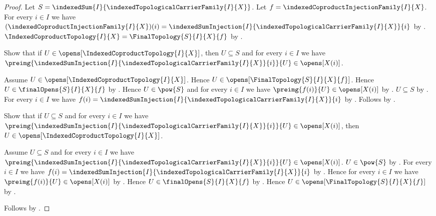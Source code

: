 \begin{proof}
    Let $S=\indexedSum{I}{
        \indexedTopologicalCarrierFamily{I}{X}}$.
    Let $f=\indexedCoproductInjectionFamily{I}{X}$.
    For every $i\in I$ we have
        $(\indexedCoproductInjectionFamily{I}{X})(i)
            =\indexedSumInjection{I}{
                \indexedTopologicalCarrierFamily{I}{X}}{i}$ by
        .
    $\IndexedCoproductTopology{I}{X}=\FinalTopology{S}{I}{X}{f}$ by
        .

    Show that if $U\in\opens[\IndexedCoproductTopology{I}{X}]$, then
        $U\subseteq S$ and for every $i\in I$ we have
            $\preimg{
                \indexedSumInjection{I}{
                    \indexedTopologicalCarrierFamily{I}{X}}{i}}{U}
            \in\opens[X(i)]$.
    \begin{subproof}
        Assume $U\in\opens[\IndexedCoproductTopology{I}{X}]$.
        Hence $U\in\opens[\FinalTopology{S}{I}{X}{f}]$.
        Hence $U\in\finalOpens{S}{I}{X}{f}$ by
            .
        Hence $U\in\pow{S}$ and for every $i\in I$ we have
            $\preimg{f(i)}{U}\in\opens[X(i)]$ by .
        $U\subseteq S$ by .
        For every $i\in I$ we have
            $f(i)=\indexedSumInjection{I}{
                \indexedTopologicalCarrierFamily{I}{X}}{i}$ by
            \auto.
        Follows by \auto.
    \end{subproof}

    Show that if $U\subseteq S$ and for every $i\in I$ we have
        $\preimg{
            \indexedSumInjection{I}{
                \indexedTopologicalCarrierFamily{I}{X}}{i}}{U}
        \in\opens[X(i)]$, then
        $U\in\opens[\IndexedCoproductTopology{I}{X}]$.
    \begin{subproof}
        Assume $U\subseteq S$ and for every $i\in I$ we have
            $\preimg{
                \indexedSumInjection{I}{
                    \indexedTopologicalCarrierFamily{I}{X}}{i}}{U}
            \in\opens[X(i)]$.
        $U\in\pow{S}$ by .
        For every $i\in I$ we have
            $f(i)=\indexedSumInjection{I}{
                \indexedTopologicalCarrierFamily{I}{X}}{i}$ by
            \auto.
        Hence for every $i\in I$ we have
            $\preimg{f(i)}{U}\in\opens[X(i)]$ by \auto.
        Hence $U\in\finalOpens{S}{I}{X}{f}$ by .
        Hence $U\in\opens[\FinalTopology{S}{I}{X}{f}]$ by
            .
    \end{subproof}
    Follows by \auto.
\end{proof}

